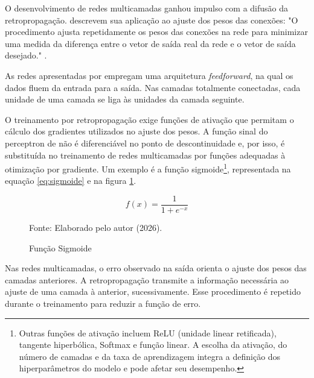 O desenvolvimento de redes multicamadas ganhou impulso com a difusão da retropropagação.  descrevem sua aplicação ao ajuste dos pesos das conexões: "O procedimento ajusta repetidamente os pesos das conexões na rede para minimizar uma medida da diferença entre o vetor de saída real da rede e o vetor de saída desejado." .

As redes apresentadas por  empregam uma arquitetura \textit{feedforward}, na qual os dados fluem da entrada para a saída. Nas camadas totalmente conectadas, cada unidade de uma camada se liga às unidades da camada seguinte.

O treinamento por retropropagação exige funções de ativação que permitam o cálculo dos gradientes utilizados no ajuste dos pesos. A função sinal do perceptron de  não é diferenciável no ponto de descontinuidade e, por isso, é substituída no treinamento de redes multicamadas por funções adequadas à otimização por gradiente. Um exemplo é a função sigmoide\footnote{Outras funções de ativação incluem ReLU (unidade linear retificada), tangente hiperbólica, Softmax e função linear. A escolha da ativação, do número de camadas e da taxa de aprendizagem integra a definição dos hiperparâmetros do modelo e pode afetar seu desempenho.}, representada na equação \ref{eq:sigmoide} e na figura \ref{fig:sigmoide}.

\begin{equation}
	\label{eq:sigmoide}
	f(x) = \dfrac{1}{1 + e^{-x}}
\end{equation}

\begin{figure}[h]
	\captionsetup{justification=centering}
	\caption{Função Sigmoide}
	\label{fig:sigmoide}
	\vspace{5pt}
	\vspace{5pt}
	\centering
	\small Fonte: Elaborado pelo autor (2026).
\end{figure}

Nas redes multicamadas, o erro observado na saída orienta o ajuste dos pesos das camadas anteriores. A retropropagação transmite a informação necessária ao ajuste de uma camada à anterior, sucessivamente. Esse procedimento é repetido durante o treinamento para reduzir a função de erro.

